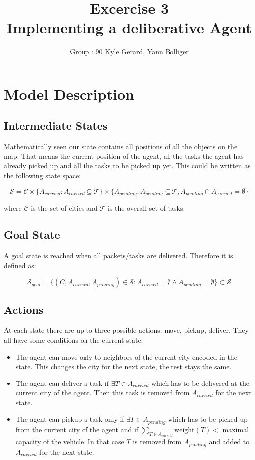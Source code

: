 \documentclass[11pt]{article}
\title{\bf Excercise 3\\ Implementing a deliberative Agent}
\author{Group \textnumero : 90  Kyle Gerard, Yann Bolliger}
\begin{document}
\maketitle

\section{Model Description}

\subsection{Intermediate States}
Mathematically seen our state contains all positions of all the objects on the 
map. That means the current position of the agent, all the tasks the agent has already picked up
and all the tasks to be picked up yet. This could be written as the following state space:

$$
\mathcal{S} = \mathcal{C} 
\times
\{ A_{carried} : A_{carried} \subseteq \mathcal{T} \}
\times
\{ A_{pending} : A_{pending} \subseteq \mathcal{T} , 
  A_{pending}  \cap A_{carried}  = \emptyset
  \}
$$

where $\mathcal{C} $ is the set of cities and $ \mathcal{T}$ is the overall set 
of tasks. 

\subsection{Goal State}
A goal state is reached when all packets/tasks are delivered. Therefore it is 
defined as:

$$
\mathcal{S}_{goal} =  \{  (C, A_{carried}, A_{pending}) \in  \mathcal{S} : 
A_{carried} = \emptyset \wedge A_{pending} = \emptyset \} \subset  \mathcal{S}
$$

\subsection{Actions}
At each state there are up to three possible actions: move, pickup, deliver. 
They all have some conditions on the current state:

\begin{itemize}
  \item
  The agent can move only to neighbors of the current city encoded in the state. 
  This changes the city for the next state, the rest stays the same.
  
    \item
  The agent can deliver a task if $ \exists T \in A_{carried}$ which has 
  to be delivered at the current city of the agent.
  Then this task is removed from $A_{carried}$ for the next state.
  
  \item
  The agent can pickup a task only if $\exists T \in A_{pending} $ which has to 
  be picked up from the current city of the agent and if 
  $\sum_{T \in A_{carried} } \text{weight} (T) < $ maximal capacity of the 
  vehicle.
  In that case $T$ is removed from  $A_{pending}$  and added to $A_{carried}$ 
  for the next state.
\end{itemize}
\end{document}

